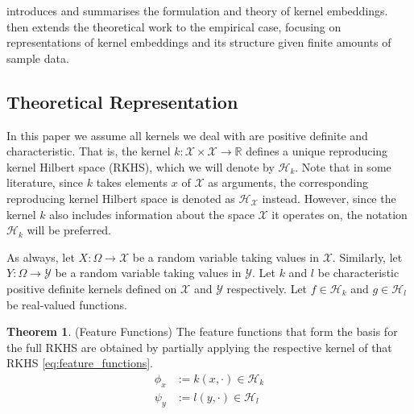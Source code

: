 \documentclass[twoside]{article} \usepackage{aistats2017}
\theoremstyle{definition}
\newtheorem{theorem}{Theorem}[section]
\newcommand{\rv}[1]{{#1}}
\newcommand{\Hk}{\mathcal{H}_{k}}
\newcommand{\Hl}{\mathcal{H}_{l}}
\begin{document}
	 introduces and summarises the formulation and theory of kernel embeddings.  then extends the theoretical work to the empirical case, focusing on representations of kernel embeddings and its structure given finite amounts of sample data.
	
	\subsection{Theoretical Representation}
	\label{sec:kernel_embeddings:theoretical_representation}
	
		In this paper we assume all kernels we deal with are positive definite and characteristic. That is, the kernel $k : \mathcal{X} \times \mathcal{X} \to \mathbb{R}$ defines a unique reproducing kernel Hilbert space (RKHS), which we will denote by $\mathcal{H}_{k}$. Note that in some literature, since $k$ takes elements $x$ of $\mathcal{X}$ as arguments, the corresponding reproducing kernel Hilbert space is denoted as $\mathcal{H}_{\mathcal{X}}$ instead. However, since the kernel $k$ also includes information about the space $\mathcal{X}$ it operates on, the notation $\mathcal{H}_{k}$ will be preferred.
		
		As always, let $\rv{X} : \Omega \to \mathcal{X}$ be a random variable taking values in $\mathcal{X}$. Similarly, let $\rv{Y} : \Omega \to \mathcal{Y}$ be a random variable taking values in $\mathcal{Y}$. Let $k$ and $l$ be characteristic positive definite kernels defined on $\mathcal{X}$ and $\mathcal{Y}$ respectively. Let $f \in \Hk$ and $g \in \Hl$ be real-valued functions.
			
		\begin{theorem} \label{thm:feature_functions}
			(Feature Functions)
			The feature functions that form the basis for the full RKHS are obtained by partially applying the respective kernel of that RKHS \eqref{eq:feature_functions}.
			\begin{equation}
			\begin{aligned}
				\phi_{x} &:= k(x, \cdot) \in \Hk \\
				\psi_{y} &:= l(y, \cdot) \in \Hl
			\label{eq:feature_functions}
			\end{aligned}
			\end{equation}
		\end{theorem}
	
\end{document}
